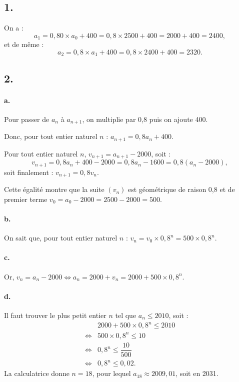 \subsection*{1.}

On a :
\[
a_1 = 0{,}80 \times a_0 + 400 = 0{,}8 \times 2500 + 400 = 2000 + 400 = 2400,
\]
et de même :
\[
a_2 = 0{,}8 \times a_1 + 400 = 0{,}8 \times 2400 + 400 = 2320.
\]

\subsection*{2.}

\paragraph{a.} Pour passer de \(a_n\) à \(a_{n+1}\), on multiplie par 0{,}8 puis on ajoute 400.  

Donc, pour tout entier naturel \(n\) : \(a_{n+1} = 0{,}8 a_n + 400\).

Pour tout entier naturel \(n\), \(v_{n+1} = a_{n+1} - 2000\), soit :
\[
v_{n+1} = 0{,}8 a_n + 400 - 2000 = 0{,}8 a_n - 1600 = 0{,}8(a_n - 2000),
\]
soit finalement : \( v_{n+1} = 0{,}8 v_n.\)

Cette égalité montre que la suite \((v_n)\) est géométrique de raison 0{,}8 et de premier terme \(v_0 = a_0 - 2000 = 2500 - 2000 = 500\).

\paragraph{b.} On sait que, pour tout entier naturel \(n\) : \(v_n = v_0 \times 0{,}8^n = 500 \times 0{,}8^n\).

\paragraph{c.} Or, \(v_n = a_n - 2000 \iff a_n = 2000 + v_n = 2000 + 500 \times 0{,}8^n\).

\paragraph{d.} Il faut trouver le plus petit entier \(n\) tel que \(a_n \leqslant 2010\), soit :
\begin{align*}
&2000 + 500 \times 0{,}8^n \leqslant 2010 \\
\iff &500 \times 0{,}8^n \leqslant 10 \\
\iff &0{,}8^n \leqslant \dfrac{10}{500} \\
\iff &0{,}8^n \leqslant 0{,}02.
\end{align*}
La calculatrice donne \(n = 18\), pour lequel \(a_{18} \approx 2009{,}01\), soit en 2031.

